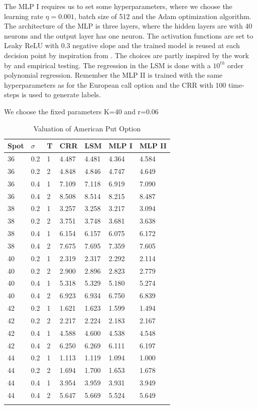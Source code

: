 The MLP I requires us to set some hyperparameters, where we choose the learning rate $\eta=0.001$, batch size of 512 and the Adam optimization algorithm. The architecture of the MLP is three layers, where the hidden layers are with 40 neurons and the output layer has one neuron. The activation functions are set to Leaky ReLU with 0.3 negative slope and the trained model is reused at each decision point by inspiration from \parencite{Lelong19}. The choices are partly inspired by the work by \parencite{Lelong19} and empirical testing. The regression in the LSM is done with a $10^{th}$ order polynomial regression. Remember the MLP II is trained with the same hyperparameters as for the European call option and the CRR with 100 time-steps is used to generate labels.\\

\begin{table}[th]
\caption{Valuation of American Put Option}{We choose the fixed parameters K=40 and r=0.06}
\label{tab:AmericanPut}
\centering
\begin{tabular}{l l l l l l l }
\toprule
\textbf{Spot} & \textbf{$\sigma$} & \textbf{T} & \textbf{CRR} & \textbf{LSM} & \textbf{MLP I} & \textbf{MLP II} \\
\midrule
36 & 0.2 & 1 & 4.487 & 4.481 & 4.364 & 4.584\\
36 & 0.2 & 2 & 4.848 & 4.846 & 4.747 & 4.649\\
36 & 0.4 & 1 & 7.109 & 7.118 & 6.919 & 7.090\\
36 & 0.4 & 2 & 8.508 & 8.514 & 8.215 & 8.487\\
38 & 0.2 & 1 & 3.257 & 3.258 & 3.217 & 3.094\\
38 & 0.2 & 2 & 3.751 & 3.748 & 3.681 & 3.638\\
38 & 0.4 & 1 & 6.154 & 6.157 & 6.075 & 6.172\\
38 & 0.4 & 2 & 7.675 & 7.695 & 7.359 & 7.605\\
40 & 0.2 & 1 & 2.319 & 2.317 & 2.292 & 2.114\\
40 & 0.2 & 2 & 2.900 & 2.896 & 2.823 & 2.779\\
40 & 0.4 & 1 & 5.318 & 5.329 & 5.180 & 5.274\\
40 & 0.4 & 2 & 6.923 & 6.934 & 6.750 & 6.839\\
42 & 0.2 & 1 & 1.621 & 1.623 & 1.599 & 1.494\\
42 & 0.2 & 2 & 2.217 & 2.224 & 2.183 & 2.167\\
42 & 0.4 & 1 & 4.588 & 4.600 & 4.538 & 4.548\\
42 & 0.4 & 2 & 6.250 & 6.269 & 6.111 & 6.197\\
44 & 0.2 & 1 & 1.113 & 1.119 & 1.094 & 1.000\\
44 & 0.2 & 2 & 1.694 & 1.700 & 1.653 & 1.678\\
44 & 0.4 & 1 & 3.954 & 3.959 & 3.931 & 3.949\\
44 & 0.4 & 2 & 5.647 & 5.669 & 5.524 & 5.649\\
\bottomrule\\
\end{tabular}
\end{table}

